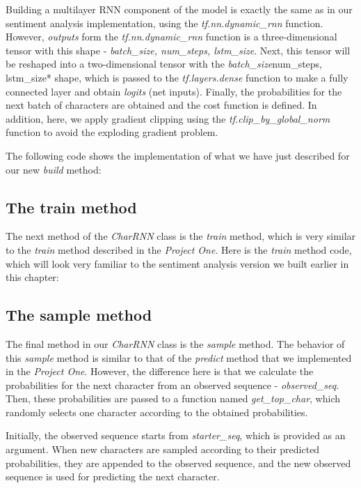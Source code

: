 \documentclass[11pt]{article}
\begin{document}
Building a multilayer RNN component of the model is exactly the same as
in our sentiment analysis implementation, using the
\emph{tf.nn.dynamic\_rnn} function. However, \emph{outputs} form the
\emph{tf.nn.dynamic\_rnn} function is a three-dimensional tensor with
this shape - \emph{batch\_size, num\_steps, lstm\_size}. Next, this
tensor will be reshaped into a two-dimensional tensor with the
\emph{batch\_size}num\_steps, lstm\_size* shape, which is passed to the
\emph{tf.layers.dense} function to make a fully connected layer and
obtain \emph{logits} (net inputs). Finally, the probabilities for the
next batch of characters are obtained and the cost function is defined.
In addition, here, we apply gradient clipping using the
\emph{tf.clip\_by\_global\_norm} function to avoid the exploding
gradient problem.

The following code shows the implementation of what we have just
described for our new \emph{build} method:

    \subsection{The train method}\label{the-train-method}

    The next method of the \emph{CharRNN} class is the \emph{train} method,
which is very similar to the \emph{train} method described in the
\emph{Project One}. Here is the \emph{train} method code, which will
look very familiar to the sentiment analysis version we built earlier in
this chapter:

    \subsection{The sample method}\label{the-sample-method}

    The final method in our \emph{CharRNN} class is the \emph{sample}
method. The behavior of this \emph{sample} method is similar to that of
the \emph{predict} method that we implemented in the \emph{Project One}.
However, the difference here is that we calculate the probabilities for
the next character from an observed sequence - \emph{observed\_seq}.
Then, these probabilities are passed to a function named
\emph{get\_top\_char}, which randomly selects one character according to
the obtained probabilities.

Initially, the observed sequence starts from \emph{starter\_seq}, which
is provided as an argument. When new characters are sampled according to
their predicted probabilities, they are appended to the observed
sequence, and the new observed sequence is used for predicting the next
character.
\end{document}
